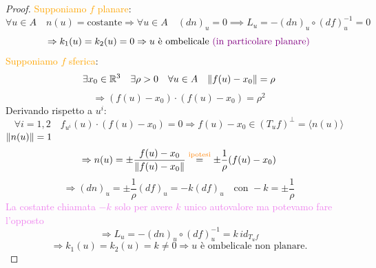 \begin{proof}
        \textcolor{orange}{Supponiamo $f$ planare}:
        \[ \forall u \in A \quad n(u) = \text{costante} \Rightarrow  \forall u \in A \quad (dn)_u = 0 \implies L_u = -(dn)_u \circ (df)_u^{-1} = 0 \]
        \[ \Rightarrow  k_1(u) = k_2(u) = 0 \Rightarrow u \text{ è ombelicale \textcolor{violet}{(in particolare planare)}} \] 
        \textcolor{orange}{Supponiamo $f$ sferica}:
        \[ \exists x_0 \in \mathbb{R}^3 \quad \exists \rho > 0 \quad \forall u \in A \quad \lVert f(u) - x_0\rVert = \rho \]
        \[ \Rightarrow (f(u) - x_0) \cdot (f(u) - x_0) = \rho^2 \]
        Derivando rispetto a $u^i$: 
        \[
        \forall i = 1, 2 \quad f_{u^i}(u) \cdot (f(u) - x_0) = 0
        \Rightarrow f(u) - x_0 \in (T_u f)^\perp = \langle n(u) \rangle  
        \]
        \textcolor{violet}{$\lVert n(u)\rVert=1$}
        \[ \Rightarrow n(u) = \pm \frac{f(u) - x_0}{\lVert f(u) - x_0\rVert} \overset{\textcolor{orange}{\substack{\text{ipotesi}}}}{=} \pm \frac{1}{\rho} (f(u) - x_0) \]
        \[ \Rightarrow (dn)_u = \pm \frac{1}{\rho} (df)_u = -k (df)_u \quad \text{con } -k = \pm \frac{1}{\rho} \]
        \textcolor{violet}{La costante chiamata $-k$ solo per avere $k$ unico autovalore ma potevamo fare l'opposto}
        \[ \Rightarrow L_u = -(dn)_u \circ (df)_u^{-1} = k \, id_{T_u f} \]
        \[ \Rightarrow k_1(u) = k_2(u) = k \neq 0 \Rightarrow u \text{ è ombelicale non planare.} \]
        \end{proof}
        \newpage


